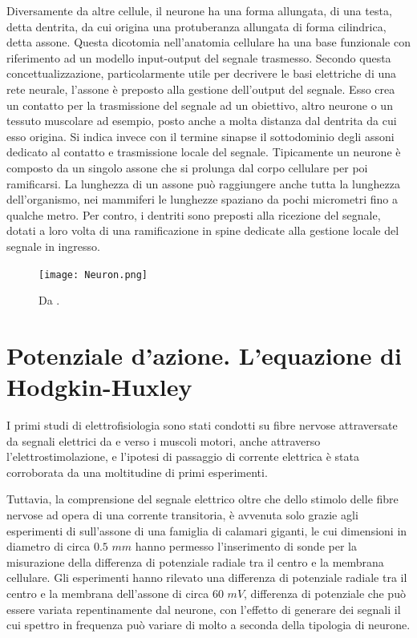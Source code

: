 Diversamente da altre cellule, il neurone ha una forma allungata, di una testa, detta dentrita, da cui origina una protuberanza allungata di forma cilindrica, detta assone. Questa dicotomia nell'anatomia cellulare ha una base funzionale con riferimento ad un modello input-output del segnale trasmesso. Secondo questa concettualizzazione, particolarmente utile per decrivere le basi elettriche di una rete neurale, l'assone è preposto alla gestione dell'output del segnale. Esso crea un contatto per la trasmissione del segnale ad un obiettivo, altro neurone o un tessuto muscolare ad esempio, posto anche a molta distanza dal dentrita da cui esso origina. Si indica invece con il termine sinapse il sottodominio degli assoni dedicato al contatto e trasmissione locale del segnale. Tipicamente un neurone è composto da un singolo assone che si prolunga dal corpo cellulare per poi ramificarsi. La lunghezza di un assone può raggiungere anche tutta la lunghezza dell'organismo, nei mammiferi le lunghezze spaziano da pochi micrometri fino a qualche metro.
Per contro, i dentriti sono preposti alla ricezione del segnale, dotati a loro volta di una ramificazione in spine dedicate alla gestione locale del segnale in ingresso.

\begin{figure}%
\centering    
\texttt{[image: Neuron.png]}
\caption[ Neurone ]
{ Da \cite{Squire2013}. }
\label{fig:Neuron}
\end{figure}




\section{Potenziale d'azione. L'equazione di Hodgkin-Huxley }
\label{sez:Potenziale}

I primi studi di elettrofisiologia sono stati condotti su fibre nervose attraversate da segnali elettrici da e verso i muscoli motori, anche attraverso l'elettrostimolazione, e l'ipotesi di passaggio di corrente elettrica è stata corroborata da una moltitudine di primi esperimenti.

Tuttavia, la comprensione del segnale elettrico oltre che dello stimolo delle fibre nervose ad opera di una corrente transitoria, è avvenuta solo grazie agli esperimenti di \cite{Hodgkin1952} sull'assone di una famiglia di calamari giganti, le cui dimensioni in diametro di circa $0.5$ $mm$ hanno permesso l'inserimento di sonde per la misurazione della differenza di potenziale radiale tra il centro e la membrana cellulare.
Gli esperimenti hanno rilevato una differenza di potenziale radiale tra il centro e la membrana dell'assone di circa $60$ $mV$, differenza di potenziale che può essere variata repentinamente dal neurone, con l'effetto di generare dei segnali il cui spettro in frequenza può variare di molto a seconda della tipologia di neurone.

